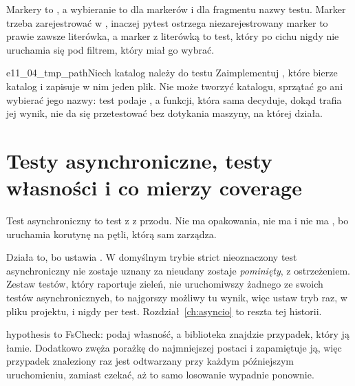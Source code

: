 \noindent
Markery to \code{[Trait]}, a wybieranie to  dla markerów i
 dla fragmentu nazwy testu. Marker trzeba zarejestrować w
, inaczej pytest ostrzega \dash{} niezarejestrowany
marker to prawie zawsze literówka, a marker z literówką to test, który po
cichu nigdy nie uruchamia się pod filtrem, który miał go wybrać.


\begin{exercise}{e11_04_tmp_path}{Niech katalog należy do testu}
Zaimplementuj , które bierze katalog i zapisuje w nim
jeden plik. Nie może tworzyć katalogu, sprzątać go ani wybierać jego nazwy:
test podaje , a funkcji, która sama decyduje, dokąd trafia
jej wynik, nie da się przetestować bez dotykania maszyny, na której działa.
\end{exercise}

\section{Testy asynchroniczne, testy własności i co mierzy coverage}
\label{sec:testing-async}

Test asynchroniczny to test z  z przodu. Nie ma opakowania, nie
ma  i nie ma , bo 
uruchamia korutynę na pętli, którą sam zarządza.


\begin{warning}
Działa to, bo  ustawia
. W domyślnym trybie strict nieoznaczony test
asynchroniczny nie zostaje uznany za nieudany \dash{} zostaje
\emph{pominięty}, z ostrzeżeniem. Zestaw testów, który raportuje zieleń, nie
uruchomiwszy żadnego ze swoich testów asynchronicznych, to najgorszy możliwy
tu wynik, więc ustaw tryb raz, w pliku projektu, i nigdy per test.
Rozdział~\ref{ch:asyncio} to reszta tej historii.
\end{warning}

\noindent
hypothesis to FsCheck: podaj własność, a biblioteka znajdzie przypadek,
który ją łamie. Dodatkowo zwęża porażkę do najmniejszej postaci i zapamiętuje
ją, więc przypadek znaleziony raz jest odtwarzany przy każdym późniejszym
uruchomieniu, zamiast czekać, aż to samo losowanie wypadnie ponownie.

